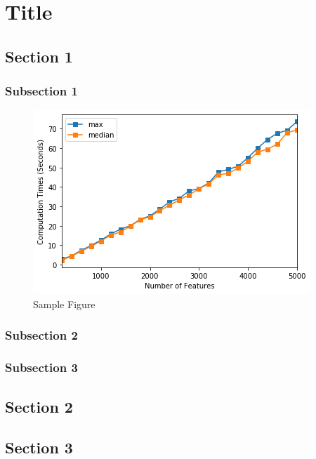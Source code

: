\doublespacing
\allowdisplaybreaks

\chapter{Title}

\section{Section 1}
\subsection{Subsection 1}

\begin{figure}[h]
    \centering
    \includegraphics[width=0.8\linewidth, keepaspectratio]{figures/sample-fig.png}
    \caption{Sample Figure}
    \label{figure:sample}
\end{figure}

\subsection{Subsection 2}
\subsection{Subsection 3}
\section{Section 2}
\section{Section 3}


